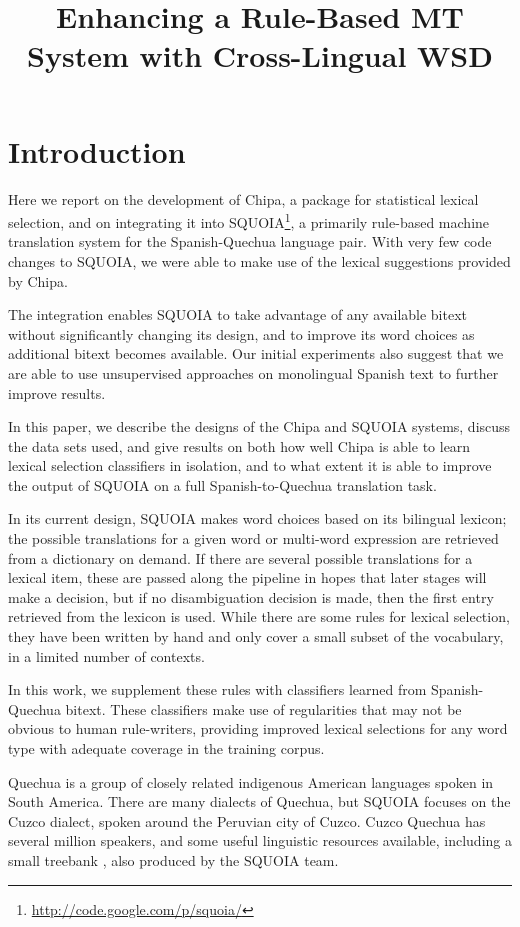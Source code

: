 \documentclass[10pt, a4paper]{article}
\title{Enhancing a Rule-Based MT System with Cross-Lingual WSD}
\begin{document}
\maketitleabstract

\section{Introduction}
Here we report on the development of Chipa, a package for statistical
lexical selection, and on integrating it into
SQUOIA\footnote{\url{http://code.google.com/p/squoia/}}, a primarily rule-based
machine translation system for the Spanish-Quechua language pair.  With very
few code changes to SQUOIA, we were able to make use of the lexical suggestions
provided by Chipa.

The integration enables SQUOIA to take advantage of any available bitext
without significantly changing its design, and to improve its word choices as
additional bitext becomes available. Our initial experiments also suggest that
we are able to use unsupervised approaches on monolingual Spanish text to
further improve results.

In this paper, we describe the designs of the Chipa and SQUOIA systems, discuss
the data sets used, and give results on both how well Chipa is able to learn
lexical selection classifiers in isolation, and to what extent it is able to
improve the output of SQUOIA on a full Spanish-to-Quechua translation task.

In its current design, SQUOIA makes word choices based on its bilingual
lexicon; the possible translations for a given word or multi-word expression
are retrieved from a dictionary on demand. If there are several possible
translations for a lexical item, these are passed along the pipeline in hopes
that later stages will make a decision, but if no disambiguation decision is
made, then the first entry retrieved from the lexicon is used. While there are
some rules for lexical selection, they have been written by hand and only cover
a small subset of the vocabulary, in a limited number of contexts.

In this work, we supplement these rules with classifiers learned from
Spanish-Quechua bitext. These classifiers make use of regularities that may not
be obvious to human rule-writers, providing improved lexical selections for
any word type with adequate coverage in the training corpus.

Quechua is a group of closely related indigenous American languages spoken in
South America. There are many dialects of Quechua, but SQUOIA focuses on the
Cuzco dialect, spoken around the Peruvian city of Cuzco.  Cuzco Quechua has
several million speakers, and some useful linguistic resources available,
including a small treebank \cite{rios2009quechua}, also produced by the SQUOIA
team.
\end{document}
